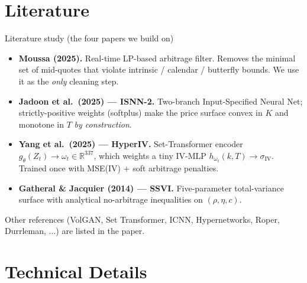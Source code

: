 \documentclass[10pt,aspectratio=169]{beamer}
\newcommand{\iv}{\sigma_{\mathrm{IV}}}
\begin{document}
\section{Literature}

\begin{frame}{Literature study (the four papers we build on)}
\begin{itemize}
  \item \textbf{Moussa (2025).} Real-time LP-based arbitrage filter. Removes the minimal set of mid-quotes that violate intrinsic / calendar / butterfly bounds. We use it as the \emph{only} cleaning step.
  \item \textbf{Jadoon et al.\ (2025) --- ISNN-2.} Two-branch Input-Specified Neural Net; strictly-positive weights (softplus) make the price surface convex in $K$ and monotone in $T$ \emph{by construction}.
  \item \textbf{Yang et al.\ (2025) --- HyperIV.} Set-Transformer encoder $g_\theta(Z_t) \to \omega_t \in \mathbb{R}^{337}$, which weights a tiny IV-MLP $h_{\omega_t}(k, T) \to \iv$. Trained once with MSE(IV) + soft arbitrage penalties.
  \item \textbf{Gatheral \& Jacquier (2014) --- SSVI.} Five-parameter total-variance surface with analytical no-arbitrage inequalities on $(\rho, \eta, c)$.
\end{itemize}
\medskip
\scriptsize Other references (VolGAN, Set Transformer, ICNN, Hypernetworks, Roper, Durrleman, $\dots$) are listed in the paper.
\end{frame}

\section{Technical Details}
\end{document}
